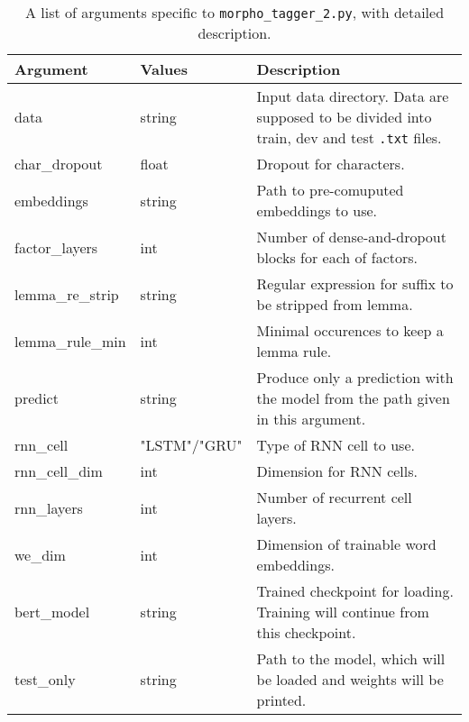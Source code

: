 \begin{table}
\centering
\begin{tabular}{ |p{3cm}|p{}|p{6cm}| } 
 \hline
 Argument & Values & Description \\ 
 \hline \hline
 data & string &  Input data directory. Data are supposed to be divided into train, dev and test \texttt{.txt} files. \\ \hline
 char\_dropout &  float &  Dropout for characters. \\ \hline
embeddings & string & Path to pre-comuputed embeddings to use. \\ \hline
factor\_layers & int & Number of dense-and-dropout blocks for each of factors.  \\ \hline
lemma\_re\_strip &  string & Regular expression for suffix to be stripped from lemma. \\ \hline
lemma\_rule\_min & int & Minimal occurences to keep a lemma rule.  \\ \hline
predict & string & Produce only a prediction with the model from the path given in this argument.  \\ \hline
rnn\_cell & "LSTM"/"GRU" & Type of RNN cell to use. \\ \hline
rnn\_cell\_dim & int & Dimension for RNN cells.  \\ \hline
rnn\_layers& int & Number of recurrent cell layers.  \\ \hline
we\_dim & int & Dimension of trainable word embeddings.  \\ \hline  


bert\_model & string & Trained checkpoint for loading. Training will continue from this checkpoint. \\ \hline

test\_only & string & Path to the model, which will be loaded and weights will be printed.  \\ \hline
 \hline
\end{tabular}
\caption{A list of arguments specific to \texttt{morpho\_tagger\_2.py}, with detailed description.} 
\label{Tab:mt2_args}
\end{table}


